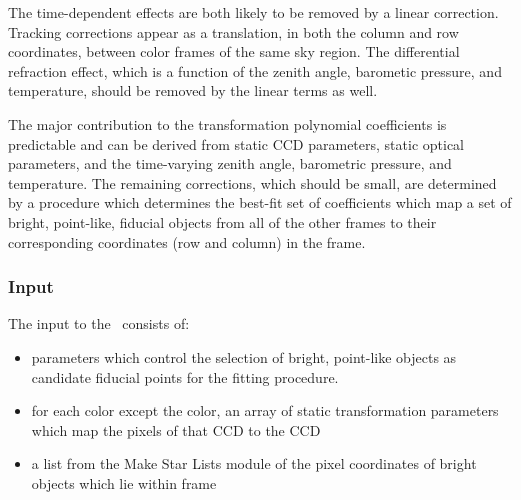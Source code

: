 The time-dependent effects are both likely to be removed by a linear
correction.
Tracking corrections appear as a translation, in both the column and row
coordinates, between color frames of the same sky region.
The differential refraction effect, which is a function of the zenith angle,
barometic pressure, and temperature, should be removed by the linear terms as
well.

The major contribution to the transformation polynomial coefficients is
predictable and can be derived from static CCD parameters, static optical
parameters, and the time-varying zenith angle, barometric pressure, and
temperature.
The remaining corrections, which should be small, are determined by a
procedure which determines the best-fit set of coefficients which map a set
of bright, point-like, fiducial objects from all of the other frames to their
corresponding coordinates (row and column) in the \/ frame.
\subsubsection{Input}

The input to the \mcm\ consists of:
\begin{itemize}
  \item parameters which control the selection of bright, point-like objects as
        candidate fiducial points for the fitting procedure.
  \item for each color except the \/ color, an array of static
        transformation parameters which map the pixels of that CCD to the
        \/ CCD
  \item a list from the Make Star Lists module of the
        pixel coordinates of bright objects which lie within frame
\end{itemize}                                        

